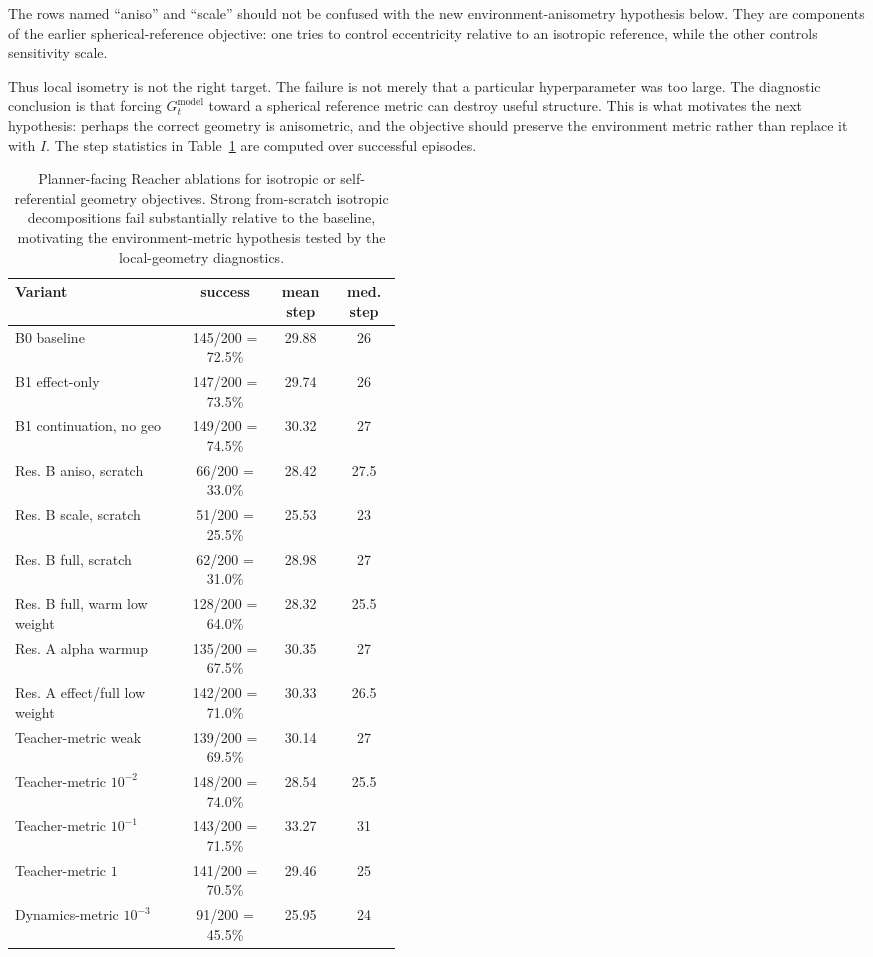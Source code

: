 ﻿\documentclass{article}
\begin{document}
The rows named ``aniso'' and ``scale'' should not be confused with the new
environment-anisometry hypothesis below.  They are components of the earlier
spherical-reference objective: one tries to control eccentricity relative to an
isotropic reference, while the other controls sensitivity scale.

Thus local isometry is not the right target.  The failure is not merely that a
particular hyperparameter was too large.  The diagnostic conclusion is that
forcing \(G^{\mathrm{model}}_t\) toward a spherical reference metric can
destroy useful structure.  This is what motivates the next hypothesis:
perhaps the correct geometry is anisometric, and the objective should preserve
the environment metric rather than replace it with \(I\).  The step statistics
in Table~\ref{tab:isotropic-ablation} are computed over successful episodes.

\begin{table}[t]
\centering
\begingroup
\scriptsize
\setlength{\tabcolsep}{3pt}
\renewcommand{\arraystretch}{0.88}
\begin{tabular}{@{}p{0.45\linewidth}ccc@{}}
\hline
Variant & success & mean step & med. step \\
\hline
B0 baseline & 145/200 = 72.5\% & 29.88 & 26 \\
B1 effect-only & 147/200 = 73.5\% & 29.74 & 26 \\
B1 continuation, no geo & 149/200 = 74.5\% & 30.32 & 27 \\
Res. B aniso, scratch & 66/200 = 33.0\% & 28.42 & 27.5 \\
Res. B scale, scratch & 51/200 = 25.5\% & 25.53 & 23 \\
Res. B full, scratch & 62/200 = 31.0\% & 28.98 & 27 \\
Res. B full, warm low weight & 128/200 = 64.0\% & 28.32 & 25.5 \\
Res. A alpha warmup & 135/200 = 67.5\% & 30.35 & 27 \\
Res. A effect/full low weight & 142/200 = 71.0\% & 30.33 & 26.5 \\
Teacher-metric weak & 139/200 = 69.5\% & 30.14 & 27 \\
Teacher-metric \(10^{-2}\) & 148/200 = 74.0\% & 28.54 & 25.5 \\
Teacher-metric \(10^{-1}\) & 143/200 = 71.5\% & 33.27 & 31 \\
Teacher-metric \(1\) & 141/200 = 70.5\% & 29.46 & 25 \\
Dynamics-metric \(10^{-3}\) & 91/200 = 45.5\% & 25.95 & 24 \\
\hline
\end{tabular}
\endgroup
\caption{Planner-facing Reacher ablations for isotropic or self-referential
geometry objectives.  Strong from-scratch isotropic decompositions fail
substantially relative to the baseline, motivating the environment-metric
hypothesis tested by the local-geometry diagnostics.}
\label{tab:isotropic-ablation}
\end{table}
\end{document}
